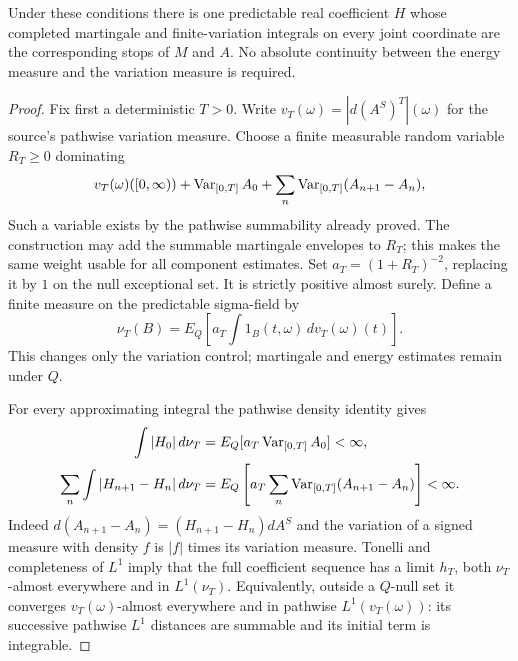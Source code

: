 \begin{lemma}\label{lem:joint-coefficient}
Under these conditions there is one predictable real coefficient $H$ whose
completed martingale and finite-variation integrals on every joint coordinate
are the corresponding stops of $M$ and $A$. No absolute continuity between
the energy measure and the variation measure is required.
\end{lemma}
\begin{proof}
Fix first a deterministic $T>0$. Write $v_T(\omega)=|d(A^S)^T|(\omega)$ for
the source's pathwise variation measure. Choose a finite measurable random
variable $R_T\geq0$ dominating
\[
 v_T(\omega)([0,\infty))+\operatorname{Var}_{[0,T]}A_0+
 \sum_n\operatorname{Var}_{[0,T]}(A_{n+1}-A_n),
\]
Such a variable exists by the pathwise summability already proved.
The construction may add the summable martingale envelopes to $R_T$;
this makes the same weight usable for all component estimates.
Set $a_T=(1+R_T)^{-2}$, replacing it by $1$ on the null exceptional set.
It is strictly positive almost surely. Define a finite measure on the
predictable sigma-field by
\[
 \nu_T(B)=E_Q\left[a_T\int1_B(t,\omega)\,dv_T(\omega)(t)\right].
\]
This changes only the variation control; martingale and energy estimates
remain under $Q$.

For every approximating integral the pathwise density identity gives
\[
 \begin{aligned}
 \int|H_0|\,d\nu_T&=E_Q[a_T\operatorname{Var}_{[0,T]}A_0]<\infty,\\
 \sum_n\int|H_{n+1}-H_n|\,d\nu_T
 &=E_Q\left[a_T\sum_n\operatorname{Var}_{[0,T]}(A_{n+1}-A_n)\right]<\infty.
 \end{aligned}
\]
Indeed $d(A_{n+1}-A_n)=(H_{n+1}-H_n)dA^S$ and the variation of a signed
measure with density $f$ is $|f|$ times its variation measure.
Tonelli and completeness of $L^1$ imply that the full coefficient sequence
has a limit $h_T$, both $\nu_T$-almost everywhere and in $L^1(\nu_T)$.
Equivalently, outside a $Q$-null set it converges $v_T(\omega)$-almost
everywhere and in pathwise $L^1(v_T(\omega))$: its successive pathwise
$L^1$ distances are summable and its initial term is integrable.


\end{proof}
